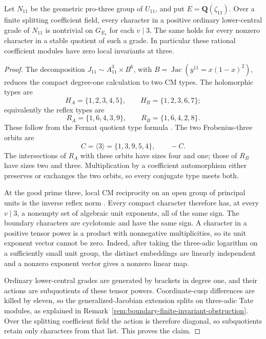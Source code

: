 \begin{lemma}
\label{lem:eleven-coefficient-local-nontriviality}
Let \(N_{11}\) be the geometric pro-three group of \(U_{11}\),
and put \(E=\mathbf Q(\zeta_{11})\). Over a finite splitting
coefficient field, every character in a positive ordinary
lower-central grade of \(N_{11}\) is nontrivial on
\(G_{E_v}\) for each \(v\mid3\). The same holds for every
nonzero character in a stable quotient of such a grade.
In particular these rational coefficient modules have zero
local invariants at three.
\end{lemma}
\begin{proof}
The decomposition \(J_{11}\sim A_{11}^3\times B^6\), with
\(B=\operatorname{Jac}(y^{11}=x(1-x)^2)\), reduces the
compact degree-one calculation to two CM types. The
holomorphic types are
\[
 H_A=\{1,2,3,4,5\},\qquad H_B=\{1,2,3,6,7\};
\]
equivalently the reflex types are
\[
 R_A=\{1,6,4,3,9\},\qquad R_B=\{1,6,4,2,8\}.
\]
These follow from the Fermat quotient type formula
\citep[\S2.1, author p.~5]{ShuExpanded2021}.
The two Frobenius-three orbits are
\[
 C=\langle3\rangle=\{1,3,9,5,4\},\qquad -C.
\]
The intersections of \(R_A\) with these orbits have sizes
four and one; those of \(R_B\) have sizes two and three.
Multiplication by a coefficient automorphism either preserves
or exchanges the two orbits, so every conjugate type meets
both.

At the good prime three, local CM reciprocity on an open
group of principal units is the inverse reflex norm
\citep[Theorem~5.1, pp.~483--484]{Lombardo2017}.
Every compact character therefore has, at every \(v\mid3\),
a nonempty set of algebraic unit exponents, all of the same
sign. The boundary characters are cyclotomic and have the
same sign. A character in a positive tensor power is a
product with nonnegative multiplicities, so its unit exponent
vector cannot be zero. Indeed, after taking the three-adic
logarithm on a sufficiently small unit group, the distinct
embeddings are linearly independent and a nonzero exponent
vector gives a nonzero linear map.

Ordinary lower-central grades are generated by brackets in
degree one, and their actions are subquotients of these tensor
powers. Coordinate-cusp differences are killed by eleven, so the
generalized-Jacobian extension splits on three-adic Tate modules,
as explained in Remark~\ref{rem:boundary-finite-invariant-obstruction}.
Over the splitting coefficient field the action is therefore
diagonal, so subquotients retain only characters from that
list. This proves the claim.
\end{proof}

